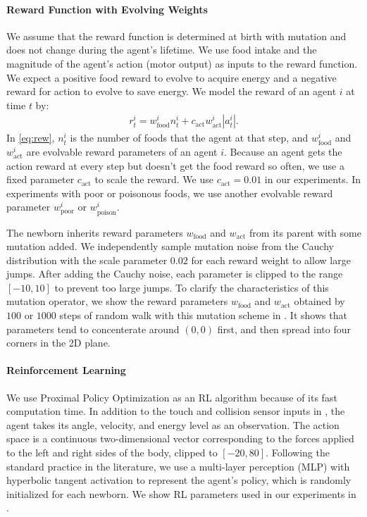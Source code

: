\paragraph{Reward Function with Evolving Weights}
We assume that the reward function is determined at birth with mutation and does not change during the agent's lifetime. We use food intake and the magnitude of the agent's action (motor output) as inputs to the reward function. We expect a positive food reward to evolve to acquire energy and a negative reward for action to evolve to save energy.
We model the reward of an agent $i$ at time $t$ by:
\begin{align}
  r^{i}_{t} = w_{\mathrm{food}}^{i}n_{t}^{i} + c_\mathrm{act} w_{\mathrm{act}}^{i}|a_{t}^{i}|\label{eq:rew}.
\end{align}
In \cref{eq:rew}, $n_{t}^{i}$ is the number of foods that the agent at that step, and $w_{\mathrm{food}}^{i}$ and $w_{\mathrm{act}}^{i}$ are evolvable reward parameters of an agent $i$. Because an agent gets the action reward at every step but doesn't get the food reward so often, we use a fixed parameter $c_\mathrm{act}$ to scale the reward. We use $c_\mathrm{act}=0.01$ in our experiments. In experiments with poor or poisonous foods, we use another evolvable reward parameter $w_{\mathrm{poor}}^{i}$ or $w_{\mathrm{poison}}^{i}$.

The newborn inherits reward parameters $w_{\mathrm{food}}$ and $w_{\mathrm{act}}$ from its parent with some mutation added. We independently sample mutation noise from the Cauchy distribution with the scale parameter $0.02$ for each reward weight to allow large jumps. After adding the Cauchy noise, each parameter is clipped to the range $[-10, 10]$ to prevent too large jumps. To clarify the characteristics of this mutation operator, we show the reward parameters $w_{\mathrm{food}}$ and $w_{\mathrm{act}}$ obtained by $100$ or $1000$ steps of random walk with this mutation scheme in . It shows that parameters tend to concenterate around $(0, 0)$ first, and then spread into four corners in the 2D plane.

\paragraph{Reinforcement Learning}
We use Proximal Policy Optimization \citep{schulmanProximalPolicyOptimization2017} as an RL algorithm because of its fast computation time. In addition to the touch and collision sensor inputs in , the agent takes its angle, velocity, and energy level as an observation. The action space is a continuous two-dimensional vector corresponding to the forces applied to the left and right sides of the body, clipped to $[-20, 80]$. Following the standard practice in the literature, we use a multi-layer perception (MLP) with hyperbolic tangent activation to represent the agent's policy, which is randomly initialized for each newborn. We show RL parameters used in our experiments in .

